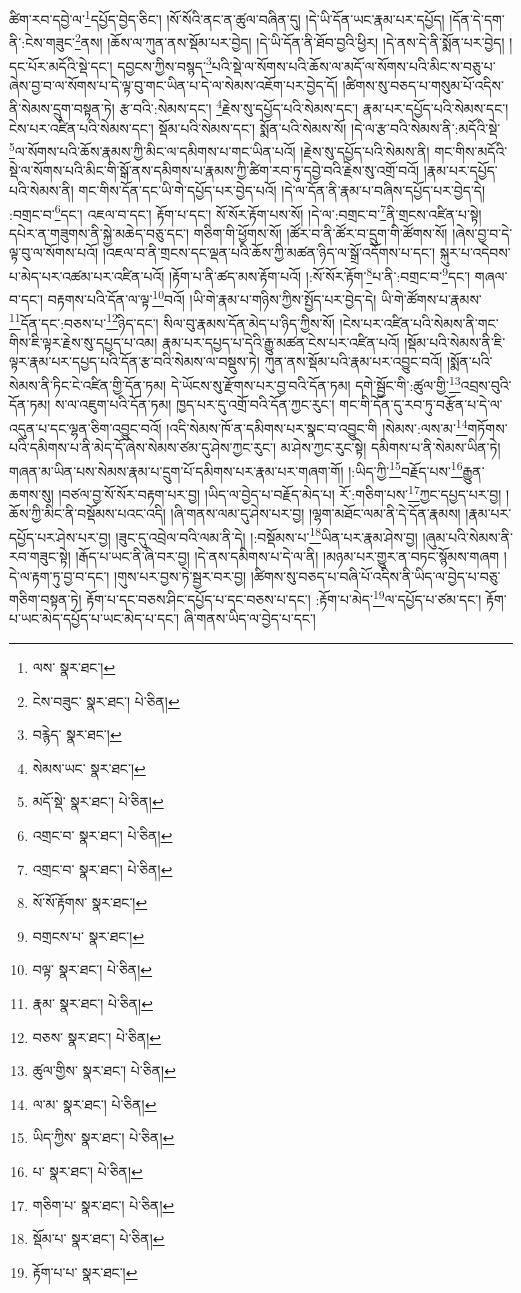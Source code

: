 ཚིག་རབ་དབྱེ་ལ་\footnote{ལས་  སྣར་ཐང་། }དཔྱོད་བྱེད་ཅིང་། །སོ་སོའི་ནང་ན་ཚུལ་བཞིན་དུ། །དེ་ཡི་དོན་ཡང་རྣམ་པར་དཔྱོད། །དོན་དེ་དག་ནི་:ངེས་གཟུང་\footnote{ངེས་བཟུང་  སྣར་ཐང་།  པེ་ཅིན། }ནས། །ཆོས་ལ་ཀུན་ནས་སྡོམ་པར་བྱེད། །དེ་ཡི་དོན་ནི་ཐོབ་བྱའི་ཕྱིར། །དེ་ནས་དེ་ནི་སྨོན་པར་བྱེད། །དང་པོར་མདོའི་སྡེ་དང་། དབྱངས་ཀྱིས་བསྙད་\footnote{བརྙེད་  སྣར་ཐང་། }པའི་སྡེ་ལ་སོགས་པའི་ཆོས་ལ་མདོ་ལ་སོགས་པའི་མིང་ས་བཅུ་པ་ཞེས་བྱ་བ་ལ་སོགས་པ་དེ་ལྟ་བུ་གང་ཡིན་པ་དེ་ལ་སེམས་འཇོག་པར་བྱེད་དོ། །ཚིགས་སུ་བཅད་པ་གསུམ་པོ་འདིས་ནི་སེམས་དྲུག་བསྟན་ཏེ། རྩ་བའི་:སེམས་དང་། \footnote{སེམས་ཡང་  སྣར་ཐང་། }རྗེས་སུ་དཔྱོད་པའི་སེམས་དང་། རྣམ་པར་དཔྱོད་པའི་སེམས་དང་། ངེས་པར་འཛིན་པའི་སེམས་དང་། སྡོམ་པའི་སེམས་དང་། སྨོན་པའི་སེམས་སོ། །དེ་ལ་རྩ་བའི་སེམས་ནི་:མདོའི་སྡེ་\footnote{མདོ་སྡེ་  སྣར་ཐང་།  པེ་ཅིན། }ལ་སོགས་པའི་ཆོས་རྣམས་ཀྱི་མིང་ལ་དམིགས་པ་གང་ཡིན་པའོ། །རྗེས་སུ་དཔྱོད་པའི་སེམས་ནི། གང་གིས་མདོའི་སྡེ་ལ་སོགས་པའི་མིང་གི་སྒོ་ནས་དམིགས་པ་རྣམས་ཀྱི་ཚིག་རབ་ཏུ་དབྱེ་བའི་རྗེས་སུ་འགྲོ་བའོ། །རྣམ་པར་དཔྱོད་པའི་སེམས་ནི། གང་གིས་དོན་དང་ཡི་གེ་དཔྱོད་པར་བྱེད་པའོ། །དེ་ལ་དོན་ནི་རྣམ་པ་བཞིས་དཔྱོད་པར་བྱེད་དེ། :བགྲང་བ་\footnote{འགྲང་བ་  སྣར་ཐང་།  པེ་ཅིན། }དང་། འཇལ་བ་དང་། རྟོག་པ་དང་། སོ་སོར་རྟོག་པས་སོ། །དེ་ལ་:བགྲང་བ་\footnote{འགྲང་བ་  སྣར་ཐང་།  པེ་ཅིན། }ནི་གྲངས་འཛིན་པ་སྟེ། དཔེར་ན་གཟུགས་ནི་སྐྱེ་མཆེད་བཅུ་དང་། གཅིག་གི་ཕྱོགས་སོ། །ཚོར་བ་ནི་ཚོར་བ་དྲུག་གི་ཚོགས་སོ། །ཞེས་བྱ་བ་དེ་ལྟ་བུ་ལ་སོགས་པའོ། །འཇལ་བ་ནི་གྲངས་དང་ལྡན་པའི་ཆོས་ཀྱི་མཚན་ཉིད་ལ་སྒྲོ་འདོགས་པ་དང་། སྐུར་པ་འདེབས་པ་མེད་པར་འཚམ་པར་འཛིན་པའོ། །རྟོག་པ་ནི་ཚད་མས་རྟོག་པའོ། །:སོ་སོར་རྟོག་\footnote{སོ་སོ་རྟོགས་  སྣར་ཐང་། }པ་ནི་:བགྲང་བ་\footnote{བགྲངས་པ་  སྣར་ཐང་། }དང་། གཞལ་བ་དང་། བརྟགས་པའི་དོན་ལ་ལྟ་\footnote{བལྟ་  སྣར་ཐང་།  པེ་ཅིན། }བའོ། །ཡི་གེ་རྣམ་པ་གཉིས་ཀྱིས་སྤྱོད་པར་བྱེད་དེ། ཡི་གེ་ཚོགས་པ་རྣམས་\footnote{རྣམ་  སྣར་ཐང་།  པེ་ཅིན། }དོན་དང་:བཅས་པ་\footnote{བཅས་  སྣར་ཐང་།  པེ་ཅིན། }ཉིད་དང་། སིལ་བུ་རྣམས་དོན་མེད་པ་ཉིད་ཀྱིས་སོ། །ངེས་པར་འཛིན་པའི་སེམས་ནི་གང་གིས་ཇི་ལྟར་རྗེས་སུ་དཔྱད་པ་འམ། རྣམ་པར་དཔྱད་པ་དེའི་རྒྱུ་མཚན་ངེས་པར་འཛིན་པའོ། །སྡོམ་པའི་སེམས་ནི་ཇི་ལྟར་རྣམ་པར་དཔྱད་པའི་དོན་རྩ་བའི་སེམས་ལ་བསྡུས་ཏེ། ཀུན་ནས་སྡོམ་པའི་རྣམ་པར་འབྱུང་བའོ། །སྨོན་པའི་སེམས་ནི་ཏིང་ངེ་འཛིན་གྱི་དོན་ཏམ། དེ་ཡོངས་སུ་རྫོགས་པར་བྱ་བའི་དོན་ཏམ། དགེ་སྦྱོང་གི་:ཚུལ་གྱི་\footnote{ཚུལ་གྱིས་  སྣར་ཐང་།  པེ་ཅིན། }འབྲས་བུའི་དོན་ཏམ། ས་ལ་འཇུག་པའི་དོན་ཏམ། ཁྱད་པར་དུ་འགྲོ་བའི་དོན་ཀྱང་རུང་། གང་གི་དོན་དུ་རབ་ཏུ་བརྩོན་པ་དེ་ལ་འདུན་པ་དང་ལྷན་ཅིག་འབྱུང་བའོ། །འདི་སེམས་ཁོ་ན་དམིགས་པར་སྣང་བ་འབྱུང་གི །སེམས་:ལས་མ་\footnote{ལ་མ་  སྣར་ཐང་།  པེ་ཅིན། }གཏོགས་པའི་དམིགས་པ་ནི་མེད་དོ་ཞེས་སེམས་ཙམ་དུ་ཤེས་ཀྱང་རུང་། མ་ཤེས་ཀྱང་རུང་སྟེ། དམིགས་པ་ནི་སེམས་ཡིན་ཏེ། གཞན་མ་ཡིན་པས་སེམས་རྣམ་པ་དྲུག་པོ་དམིགས་པར་རྣམ་པར་གཞག་གོ། །:ཡིད་ཀྱི་\footnote{ཡིད་ཀྱིས་  སྣར་ཐང་།  པེ་ཅིན། }བརྗོད་པས་\footnote{པ་  སྣར་ཐང་།  པེ་ཅིན། }རྒྱུན་ཆགས་སུ། །བཙལ་བྱ་སོ་སོར་བརྟག་པར་བྱ། །ཡིད་ལ་བྱེད་པ་བརྗོད་མེད་པ། རོ་:གཅིག་པས་\footnote{གཅིག་པ་  སྣར་ཐང་།  པེ་ཅིན། }ཀྱང་དཔྱད་པར་བྱ། །ཆོས་ཀྱི་མིང་ནི་བསྡོམས་པའང་འདི། །ཞི་གནས་ལམ་དུ་ཤེས་པར་བྱ། །ལྷག་མཐོང་ལམ་ནི་དེ་དོན་རྣམས། །རྣམ་པར་དཔྱོད་པར་ཤེས་པར་བྱ། །ཟུང་དུ་འབྲེལ་བའི་ལམ་ནི་དེ། །:བསྡོམས་པ་\footnote{སྡོམ་པ་  སྣར་ཐང་།  པེ་ཅིན། }ཡིན་པར་རྣམ་ཤེས་བྱ། །ཞུམ་པའི་སེམས་ནི་རབ་གཟུང་སྟེ། །རྒོད་པ་ཡང་ནི་ཞི་བར་བྱ། །དེ་ནས་དམིགས་པ་དེ་ལ་ནི། །མཉམ་པར་གྱུར་ན་བཏང་སྙོམས་གཞག །དེ་ལ་རྟག་ཏུ་བྱ་བ་དང་། །གུས་པར་བྱས་ཏེ་སྦྱར་བར་བྱ། །ཚིགས་སུ་བཅད་པ་བཞི་པོ་འདིས་ནི་ཡིད་ལ་བྱེད་པ་བཅུ་གཅིག་བསྟན་ཏེ། རྟོག་པ་དང་བཅས་ཤིང་དཔྱོད་པ་དང་བཅས་པ་དང་། :རྟོག་པ་མེད་\footnote{རྟོག་པ་པ་  སྣར་ཐང་། }ལ་དཔྱོད་པ་ཙམ་དང་། རྟོག་པ་ཡང་མེད་དཔྱོད་པ་ཡང་མེད་པ་དང་། ཞི་གནས་ཡིད་ལ་བྱེད་པ་དང་། 